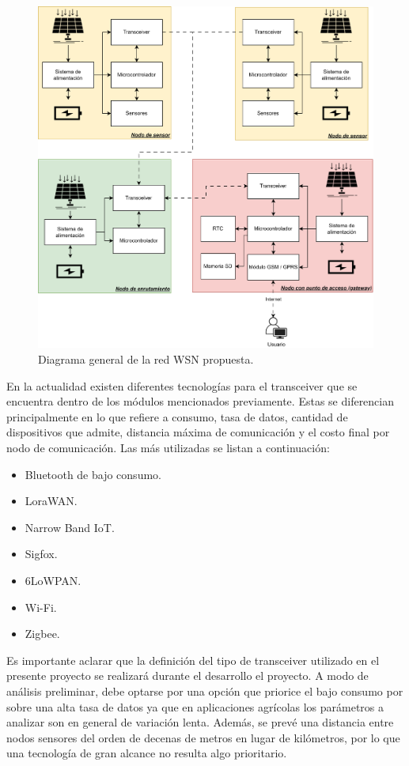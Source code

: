 \documentclass[
11pt, %
codirector, %
]{charter}
\begin{document}
\begin{figure}[H]
\centering 
\includegraphics[width=.9\textwidth]{./Figuras/DiagramaGeneral.png}
\caption{Diagrama general de la red WSN propuesta.}
\label{fig:DiagramaGeneral}
\end{figure}


En la actualidad existen diferentes tecnologías para el transceiver que se encuentra dentro de los módulos mencionados previamente. Estas se diferencian principalmente en lo que refiere a consumo, tasa de datos, cantidad de dispositivos que admite, distancia máxima de comunicación y el costo final por nodo de comunicación. Las más utilizadas se listan a continuación:

\begin{itemize}
\item Bluetooth de bajo consumo.
\item LoraWAN.
\item Narrow Band IoT.
\item Sigfox.
\item 6LoWPAN.
\item Wi-Fi.
\item Zigbee.
\end{itemize}

Es importante aclarar que la definición del tipo de transceiver utilizado en el presente proyecto se realizará durante el desarrollo el proyecto. A modo de análisis preliminar, debe optarse por una opción que priorice el bajo consumo por sobre una alta tasa de datos ya que en aplicaciones agrícolas los parámetros a analizar son en general de variación lenta. Además, se prevé una distancia entre nodos sensores del orden de decenas de metros en lugar de kilómetros, por lo que una tecnología de gran alcance no resulta algo prioritario.
\end{document}
